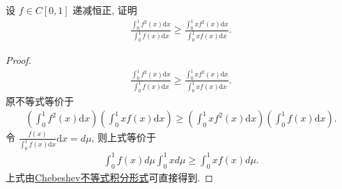 \documentclass[../../main.tex]{subfiles}
\begin{document}
\begin{example}
设 $f \in C[0,1]$ 递减恒正, 证明
\begin{align*}
\frac{\int_0^1 f^2(x)\mathrm{d}x}{\int_0^1 f(x)\mathrm{d}x} \geqslant \frac{\int_0^1 xf^2(x)\mathrm{d}x}{\int_0^1 xf(x)\mathrm{d}x}.
\end{align*}
\end{example}
\begin{proof}
\begin{align*}
\frac{\int_0^1 f^2(x)\mathrm{d}x}{\int_0^1 f(x)\mathrm{d}x} \geqslant \frac{\int_0^1 xf^2(x)\mathrm{d}x}{\int_0^1 xf(x)\mathrm{d}x}.
\end{align*}
原不等式等价于
\begin{align*}
\left(\int_0^1 f^2(x)\mathrm{d}x\right)\left(\int_0^1 xf(x)\mathrm{d}x\right) \geqslant \left(\int_0^1 xf^2(x)\mathrm{d}x\right)\left(\int_0^1 f(x)\mathrm{d}x\right).
\end{align*}
令 $\frac{f(x)}{\int_0^1 f(x)\mathrm{d}x}\mathrm{d}x = d\mu$, 则上式等价于
\begin{align*}
\int_0^1 f(x)d\mu \int_0^1 xd\mu \geqslant \int_0^1 xf(x)d\mu.
\end{align*}
上式由\hyperref[Chebeshev不等式积分形式]{Chebeshev不等式积分形式}可直接得到. 
\end{proof}
\end{document}
